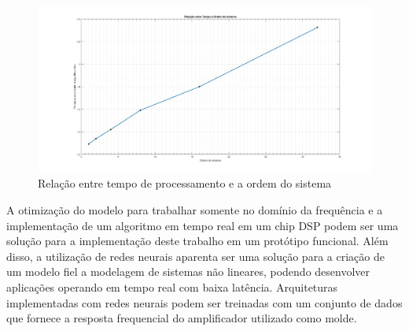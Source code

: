 \begin{figure}[!ht]
	\centering
	\includegraphics[width=1\linewidth]{figuras/TempoxOrdem.jpg}
	\caption{Relação entre tempo de processamento e a ordem do sistema}
	\label{fig:Tempo}
\end{figure}

A otimização do modelo para trabalhar somente no domínio da frequência e a implementação de um algoritmo em tempo real em um chip DSP podem ser uma solução para a implementação deste trabalho em um protótipo funcional. Além disso, a utilização de redes neurais aparenta ser uma solução para a criação de um modelo fiel a modelagem de sistemas não lineares, podendo desenvolver aplicações operando em tempo real com baixa latência. Arquiteturas implementadas com redes neurais podem ser treinadas com um conjunto de dados que fornece a resposta frequencial do amplificador utilizado como molde.